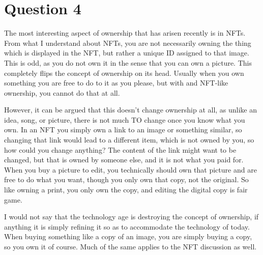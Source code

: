 \documentclass[12pt]{article}
\begin{document}
\section*{Question 4}
The most interesting aspect of ownership that has arisen recently is in NFTs. From what I understand about NFTs, you are not necessarily owning the thing which is displayed in the NFT, but rather a unique ID assigned to that image. This is odd, as you do not own it in the sense that you can own a picture. This completely flips the concept of ownership on its head. Usually when you own something you are free to do to it as you please, but with and NFT-like ownership, you cannot do that at all.

However, it can be argued that this doesn't change ownership at all, as unlike an idea, song, or picture, there is not much TO change once you know what you own. In an NFT you simply own a link to an image or something similar, so changing that link would lead to a different item, which is not owned by you, so how could you change anything? The content of the link might want to be changed, but that is owned by someone else, and it is not what you paid for. When you buy a picture to edit, you technically should own that picture and are free to do what you want, though you only own that copy, not the original. So like owning a print, you only own the copy, and editing the digital copy is fair game.

I would not say that the technology age is destroying the concept of ownership, if anything it is simply refining it so as to accommodate the technology of today. When buying something like a copy of an image, you are simply buying a copy, so you own it of course. Much of the same applies to the NFT discussion as well. 
\end{document}
